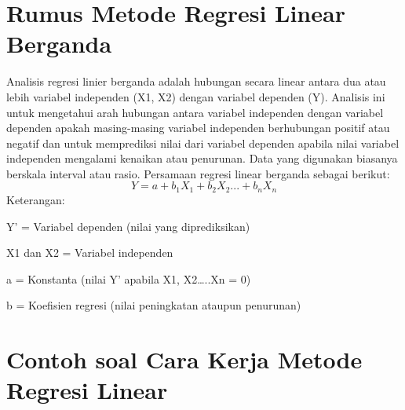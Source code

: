 \section{Rumus Metode Regresi Linear Berganda}

Analisis regresi linier berganda adalah hubungan secara linear antara dua atau lebih variabel independen (X1, X2) dengan variabel dependen (Y). Analisis ini untuk mengetahui arah hubungan antara variabel independen dengan variabel dependen apakah masing-masing variabel independen berhubungan positif atau negatif dan untuk memprediksi nilai dari variabel dependen apabila nilai variabel independen mengalami kenaikan atau penurunan. Data yang digunakan biasanya berskala interval atau rasio\citep{smadi2012least}.
Persamaan regresi linear berganda sebagai berikut:
\begin{equation}
        Y= a+b_{1}X_{1}+b_{2}X_{2}...+b_{n}X_{n}
    \end{equation}
Keterangan:
\par Y’                    =   Variabel dependen (nilai yang diprediksikan)
\par X1 dan X2      =   Variabel independen
\par a                      =   Konstanta (nilai Y’ apabila X1, X2…..Xn = 0)
\par b                            =    Koefisien regresi (nilai peningkatan ataupun penurunan)
\section{Contoh soal Cara Kerja Metode Regresi Linear}
